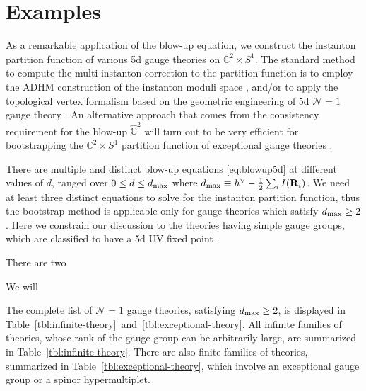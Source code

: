 \documentclass[letterpaper, 11pt]{article}
\begin{document}





\section{Examples} \label{sec:example}

As a remarkable application of the blow-up equation, we construct the instanton partition function of various 5d gauge theories on $\mathbb{C}^2 \times S^1 $. The standard method to compute the multi-instanton correction to the partition function is to employ the ADHM construction of the instanton moduli space \cite{Atiyah:1978ri,Nekrasov:2002qd,Nekrasov:2003rj}, and/or to apply the topological vertex formalism based on the geometric engineering of 5d $\mathcal{N}=1$ gauge theory \cite{Gopakumar:1998jq,Aganagic:2003db}. An alternative approach that comes from the consistency requirement for the blow-up $\hat{\mathbb{C}}^2$ will turn out to be very efficient for bootstrapping the $\mathbb{C}^2 \times S^1 $ partition function of exceptional gauge theories \cite{Keller:2012da, Huang:2017mis, Gu:2018gmy}.

There are multiple and distinct blow-up equations \eqref{eq:blowup5d} at different values of $d$, ranged over $0 \leq d \leq d_{\rm max}$ where $d_{\rm max} \equiv h^\vee 
- \frac{1}{2}\sum_{i} I(\mathbf{R}_i)$. We need at least three distinct equations to solve for the instanton partition function, thus the bootstrap method is applicable only for gauge theories which satisfy $d_{\rm max} \geq 2$. Here we constrain our discussion to the theories having simple gauge groups, which are classified to have a 5d UV fixed point \cite{Jefferson:2017ahm}. 


There are two 




We will 



The complete list of $\mathcal{N}=1$ gauge theories, satisfying $d_{\rm max} \geq 2$, is displayed in Table~\ref{tbl:infinite-theory}~and~\ref{tbl:exceptional-theory}.
All infinite families of theories, whose rank of the gauge group can be arbitrarily large, are summarized in Table~\ref{tbl:infinite-theory}. There are also finite families of theories, summarized in Table~\ref{tbl:exceptional-theory}, which involve an exceptional gauge group or a spinor hypermultiplet. 
\end{document}
